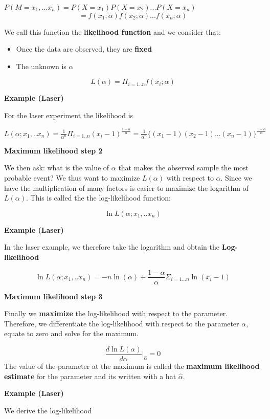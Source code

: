 \documentclass[
]{book}
\providecommand{\tightlist}{%
  \setlength{\itemsep}{0pt}\setlength{\parskip}{0pt}}
\begin{document}
\(P(M=x_1,...x_n)=P(X=x_1)P(X=x_2)...P(X=x_n)\)
\[=f(x_1;\alpha)f(x_2;\alpha) ...f(x_n;\alpha)\]

We call this function the \textbf{likelihood function} and we consider that:

\begin{itemize}
\tightlist
\item
  Once the data are observed, they are \textbf{fixed}
\item
  The unknown is \(\alpha\)
\end{itemize}

\[L(\alpha)= \Pi_{i=1..n} f(x_i; \alpha)\]

\textbf{Example (Laser)}

For the laser experiment the likelihood is

\(L(\alpha;x_1,..x_n)= \frac{1}{\alpha^n} \Pi_{i=1..n} (x_i-1)^{\frac{1-\alpha}{\alpha}}= \frac{1}{\alpha^n} \{(x_1-1)(x_2-1)...(x_n-1)\}^{\frac{1-\alpha}{\alpha}}\)

\textbf{Maximum likelihood step 2}

We then ask: what is the value of \(\alpha\) that makes the observed sample the most probable event? We thus want to maximize \(L(\alpha)\) with respect to \(\alpha\). Since we have the multiplication of many factors is easier to maximize the logarithm of \(L(\alpha)\). This is called the the log-likelihood function:

\[\ln L(\alpha;x_1,..x_n)\]

\textbf{Example (Laser)}

In the laser example, we therefore take the logarithm and obtain the \textbf{Log-likelihood}

\[\ln L(\alpha;x_1,..x_n)= -n \ln(\alpha) + {\frac{1-\alpha}{\alpha}} \Sigma_{i=1...n} \ln (x_i-1)\]

\textbf{Maximum likelihood step 3}

Finally we \textbf{maximize} the log-likelihood with respect to the parameter. Therefore, we differentiate the log-likelihood with respect to the parameter \(\alpha\), equate to zero and solve for the maximum.

\[\frac{d \ln L(\alpha)}{d \alpha} \big|_{\hat{\alpha}}=0 \]
The value of the parameter at the maximum is called the \textbf{maximum likelihood estimate} for the parameter and its written with a hat \(\hat{\alpha}\).

\textbf{Example (Laser)}

We derive the log-likelihood
\end{document}
